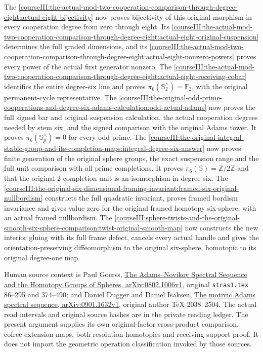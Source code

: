 The \cref{courseIII:the-actual-mod-two-cooperation-comparison-through-degree-eight:actual-eight-bijectivity} now proves bijectivity of this original morphism in every cooperation degree from zero through eight. Its \cref{courseIII:the-actual-mod-two-cooperation-comparison-through-degree-eight:actual-eight-original-suspension} determines the full graded dimensions, and its \cref{courseIII:the-actual-mod-two-cooperation-comparison-through-degree-eight:actual-eight-nonzero-powers} proves every power of the actual first generator nonzero. The \cref{courseIII:the-actual-mod-two-cooperation-comparison-through-degree-eight:actual-eight-receiving-cobar} identifies the entire degree-six line and proves \(\pi_6(\mathbb S^{\wedge}_2)=\mathbb F_2\), with the original permanent-cycle representative. The \cref{courseIII:the-original-odd-prime-cooperations-and-degree-six-adams-calculation:odd-actual-adams} now proves the full signed bar and original suspension calculation, the actual cooperation degrees needed by stem six, and the signed comparison with the original Adams tower. It proves \(\pi_6(\mathbb S^{\wedge}_p)=0\) for every odd prime. The \cref{courseIII:the-original-integral-stable-group-and-its-completion-maps:integral-degree-six-answer} now proves finite generation of the original sphere groups, the exact suspension range and the full unit comparison with all prime completions. It proves \(\pi_6(\mathbb S)=\mathbb Z/2\mathbb Z\) and that the original 2-completion unit is an isomorphism in degree six. The \cref{courseIII:the-original-six-dimensional-framing-invariant:framed-six-original-nullbordism} constructs the full quadratic invariant, proves framed bordism invariance and gives value zero for the original framed homotopy six-sphere, with an actual framed nullbordism. The \cref{courseIII:sphere-twists-and-the-original-smooth-six-sphere-comparison:twist-original-smooth-map} now constructs the new interior gluing with its full frame defect, cancels every actual handle and gives the orientation-preserving diffeomorphism to the original six-sphere, homotopic to its original degree-one map.

Human source context is Paul Goerss, \href{https://arxiv.org/abs/0802.1006v1}{The Adams--Novikov Spectral Sequence and the Homotopy Groups of Spheres, arXiv:0802.1006v1}, original \texttt{stras1.tex} 86--295 and 374--490; and Daniel Dugger and Daniel Isaksen, \href{https://arxiv.org/abs/0901.1632v1}{The motivic Adams spectral sequence, arXiv:0901.1632v1}, original author TeX 2038--2504. The actual read intervals and original source hashes are in the private reading ledger. The present argument supplies its own original-factor cross-product comparison, cofree extension maps, both resolution homotopies and receiving support proof. It does not import the geometric operation classification invoked by those sources.

